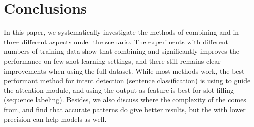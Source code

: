 \section{Conclusions}
In this paper, we systematically investigate the methods of combining \NN and \RE in three different aspects under the \NLU scenario. The experiments with different numbers of training data show that combining \NN and \RE significantly improves the performance on few-shot learning settings, and there still remains clear improvements when using the full dataset. While most methods work, the best-performant method for intent detection (sentence classification) is using \RE to guide the attention module, and using the \RE output as feature is best for slot filling (sequence labeling). Besides, we also discuss where the complexity of the \RE comes from, and find that accurate \RE patterns do give better results, but the \REs with lower precision can help \NN models as well.